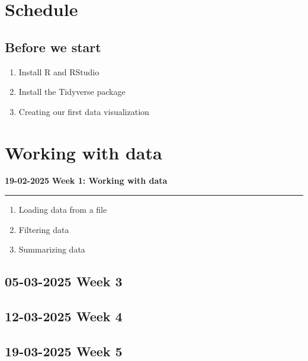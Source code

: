 \documentclass{article}
\newcommand{\week}[2]{
    \begin{center}
        \textbf{#1} \hfill \textbf{#2}
    \end{center}
    \hrule
}
\begin{document}
\section*{Schedule}

\subsection*{Before we start}
\begin{enumerate}
    \item Install R and RStudio
    \item Install the Tidyverse package
    \item Creating our first data visualization
\end{enumerate}

\section{Working with data}


\week{19-02-2025}{Week 1: Working with data}

\begin{enumerate}
    \item Loading data from a file
    \item Filtering data
    \item Summarizing data
\end{enumerate}





\subsection*{05-03-2025 \textbf{Week 3}}

\subsection*{12-03-2025 \textbf{Week 4}}
\subsection*{19-03-2025 \textbf{Week 5}}
\end{document}
